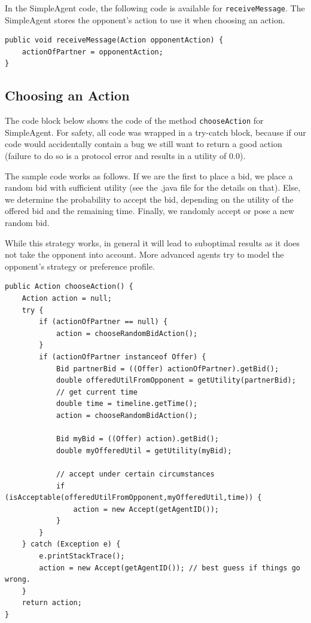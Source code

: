 \documentclass[]{article}
\begin{document}
In the SimpleAgent code, the following code is available for \texttt{receiveMessage}. The SimpleAgent stores the opponent's action to use it when choosing an action.

\begin{lstlisting}
public void receiveMessage(Action opponentAction) {
	actionOfPartner = opponentAction;
}
\end{lstlisting}

\subsection{Choosing an Action}\label{sec:chooseAction}
The code block below shows the code of the method \texttt{chooseAction} for SimpleAgent. For safety, all code was wrapped in a try-catch block, because if our code would accidentally contain a bug we still want to return a good action (failure to do so is a protocol error and results in a utility of 0.0).

The sample code works as follows. If we are the first to place a bid, we place a random bid with sufficient utility (see the .java file for the details on that). Else, we determine the probability to accept the bid, depending on the utility of the offered bid and the remaining time. Finally, we randomly accept or pose a new random bid.

While this strategy works, in general it will lead to suboptimal results as it does not take the opponent into account. More advanced agents try to model the opponent's strategy or preference profile.

\begin{lstlisting}
public Action chooseAction() {
	Action action = null;
	try { 
		if (actionOfPartner == null) {
			action = chooseRandomBidAction();
		}
		if (actionOfPartner instanceof Offer) {
			Bid partnerBid = ((Offer) actionOfPartner).getBid();
			double offeredUtilFromOpponent = getUtility(partnerBid);
			// get current time
			double time = timeline.getTime();
			action = chooseRandomBidAction();
			
			Bid myBid = ((Offer) action).getBid();
			double myOfferedUtil = getUtility(myBid);
			
			// accept under certain circumstances
			if (isAcceptable(offeredUtilFromOpponent,myOfferedUtil,time)) {
				action = new Accept(getAgentID());
			}
		}
	} catch (Exception e) { 
		e.printStackTrace();
		action = new Accept(getAgentID()); // best guess if things go wrong. 
	}
	return action;
}
\end{lstlisting}
\end{document}
